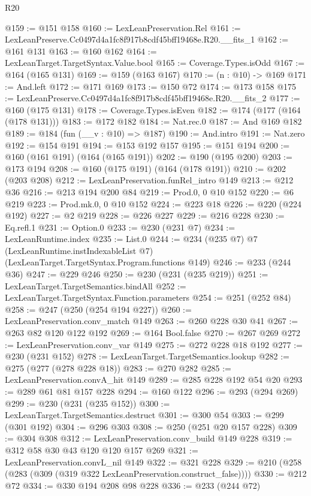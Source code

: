 \begin{lexlean}{R20}
\begin{coremodule}
@159 := @151 @158
@160 := LexLeanPreservation.Rel
@161 := LexLeanPreserve.Cc0497d4a1fc8f917b8cdf45bff19468e.R20.__fits_1
@162 := @161 @131
@163 := @160 @162
@164 := LexLeanTarget.TargetSyntax.Value.bool
@165 := Coverage.Types.isOdd
@167 := @164 (@165 @131)
@169 := @159 (@163 @167)
@170 := (n : @10) -> @169
@171 := And.left
@172 := @171 @169
@173 := @150 @72
@174 := @173 @158
@175 := LexLeanPreserve.Cc0497d4a1fc8f917b8cdf45bff19468e.R20.__fits_2
@177 := @160 (@175 @131)
@178 := Coverage.Types.isEven
@182 := @174 (@177 (@164 (@178 @131)))
@183 := @172 @182
@184 := Nat.rec.{0}
@187 := And @169 @182
@189 := @184 (fun (__v : @10) => @187)
@190 := And.intro
@191 := Nat.zero
@192 := @154 @191
@194 := @153 @192 @157
@195 := @151 @194
@200 := @160 (@161 @191) (@164 (@165 @191))
@202 := @190 (@195 @200)
@203 := @173 @194
@208 := @160 (@175 @191) (@164 (@178 @191))
@210 := @202 (@203 @208)
@212 := LexLeanPreservation.funRel_intro @149
@213 := @212 @36
@216 := @213 @194 @200 @84
@219 := Prod.{0, 0} @10 @152
@220 := @6 @219
@223 := Prod.mk.{0, 0} @10 @152
@224 := @223 @18
@226 := @220 (@224 @192)
@227 := @2 @219
@228 := @226 @227
@229 := @216 @228
@230 := Eq.refl.{1}
@231 := Option.{0}
@233 := @230 (@231 @7)
@234 := LexLeanRuntime.index
@235 := List.{0}
@244 := @234
    (@235 @7)
    @7
    (LexLeanRuntime.instIndexableList @7)
    (LexLeanTarget.TargetSyntax.Program.functions @149)
@246 := @233 (@244 @36)
@247 := @229 @246
@250 := @230 (@231 (@235 @219))
@251 := LexLeanTarget.TargetSemantics.bindAll
@252 := LexLeanTarget.TargetSyntax.Function.parameters
@254 := @251 (@252 @84)
@258 := @247 (@250 (@254 @194 @227))
@260 := LexLeanPreservation.conv_match @149
@263 := @260 @228 @30 @41
@267 := @263 @82 @120 @122 @192
@269 := @164 Bool.false
@270 := @267 @269
@272 := LexLeanPreservation.conv_var @149
@275 := @272 @228 @18 @192
@277 := @230 (@231 @152)
@278 := LexLeanTarget.TargetSemantics.lookup
@282 := @275 (@277 (@278 @228 @18))
@283 := @270 @282
@285 := LexLeanPreservation.convA_hit @149
@289 := @285 @228 @192 @54 @20
@293 := @289 @61 @81 @157 @228
@294 := @160 @122
@296 := @293 (@294 @269)
@299 := @230 (@231 (@235 @152))
@300 := LexLeanTarget.TargetSemantics.destruct
@301 := @300 @54
@303 := @299 (@301 @192)
@304 := @296 @303
@308 := @250 (@251 @20 @157 @228)
@309 := @304 @308
@312 := LexLeanPreservation.conv_build @149 @228
@319 := @312 @58 @30 @43 @120 @120 @157 @269
@321 := LexLeanPreservation.convL_nil @149
@322 := @321 @228
@329 := @210 (@258 (@283 (@309 (@319 @322 LexLeanPreservation.construct_false))))
@330 := @212 @72
@334 := @330 @194 @208 @98 @228
@336 := @233 (@244 @72)

\end{coremodule}
\end{lexlean}
